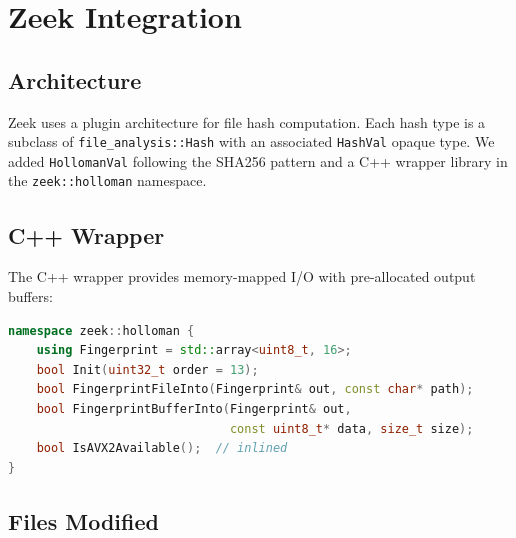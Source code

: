 \documentclass[11pt,a4paper]{article}
\begin{document}
\section{Zeek Integration}

\subsection{Architecture}

Zeek uses a plugin architecture for file hash computation.  Each hash type
is a subclass of \texttt{file\_analysis::Hash} with an associated
\texttt{HashVal} opaque type.  We added \texttt{HollomanVal} following the
SHA256 pattern and a C++ wrapper library in the \texttt{zeek::holloman}
namespace.

\subsection{C++ Wrapper}

The C++ wrapper provides memory-mapped I/O with pre-allocated output buffers:

\begin{lstlisting}[language=C++]
namespace zeek::holloman {
    using Fingerprint = std::array<uint8_t, 16>;
    bool Init(uint32_t order = 13);
    bool FingerprintFileInto(Fingerprint& out, const char* path);
    bool FingerprintBufferInto(Fingerprint& out,
                               const uint8_t* data, size_t size);
    bool IsAVX2Available();  // inlined
}
\end{lstlisting}

\subsection{Files Modified}
\end{document}
